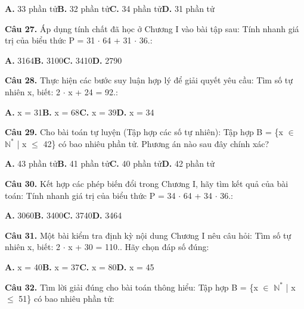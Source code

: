 \documentclass[11pt,a4paper]{article}
\begin{document}
\hspace*{1.5em}\textbf{A.} 33 phần tử\quad\quad \textbf{B.} 32 phần tử\quad\quad \textbf{C.} 34 phần tử\quad\quad \textbf{D.} 31 phần tử\par\vspace{2pt}
\textbf{\color{primary} Câu 27.} Áp dụng tính chất đã học ở Chương I vào bài tập sau: Tính nhanh giá trị của biểu thức P = 31 $\cdot$ 64 + 31 $\cdot$ 36.:\par
\hspace*{1.5em}\textbf{A.} 3164\quad\quad \textbf{B.} 3100\quad\quad \textbf{C.} 3410\quad\quad \textbf{D.} 2790\par\vspace{2pt}
\textbf{\color{primary} Câu 28.} Thực hiện các bước suy luận hợp lý để giải quyết yêu cầu: Tìm số tự nhiên x, biết: 2 $\cdot$ x + 24 = 92.:\par
\hspace*{1.5em}\textbf{A.} x = 31\quad\quad \textbf{B.} x = 68\quad\quad \textbf{C.} x = 39\quad\quad \textbf{D.} x = 34\par\vspace{2pt}
\textbf{\color{primary} Câu 29.} Cho bài toán tự luyện (Tập hợp các số tự nhiên): Tập hợp B = \{x $\in$ $\mathbb{N}^*$ | x $\le$ 42\} có bao nhiêu phần tử. Phương án nào sau đây chính xác?\par
\hspace*{1.5em}\textbf{A.} 43 phần tử\quad\quad \textbf{B.} 41 phần tử\quad\quad \textbf{C.} 40 phần tử\quad\quad \textbf{D.} 42 phần tử\par\vspace{2pt}
\textbf{\color{primary} Câu 30.} Kết hợp các phép biến đổi trong Chương I, hãy tìm kết quả của bài toán: Tính nhanh giá trị của biểu thức P = 34 $\cdot$ 64 + 34 $\cdot$ 36.:\par
\hspace*{1.5em}\textbf{A.} 3060\quad\quad \textbf{B.} 3400\quad\quad \textbf{C.} 3740\quad\quad \textbf{D.} 3464\par\vspace{2pt}
\textbf{\color{primary} Câu 31.} Một bài kiểm tra định kỳ nội dung Chương I nêu câu hỏi: Tìm số tự nhiên x, biết: 2 $\cdot$ x + 30 = 110.. Hãy chọn đáp số đúng:\par
\hspace*{1.5em}\textbf{A.} x = 40\quad\quad \textbf{B.} x = 37\quad\quad \textbf{C.} x = 80\quad\quad \textbf{D.} x = 45\par\vspace{2pt}
\textbf{\color{primary} Câu 32.} Tìm lời giải đúng cho bài toán thông hiểu: Tập hợp B = \{x $\in$ $\mathbb{N}^*$ | x $\le$ 51\} có bao nhiêu phần tử:\par
\end{document}
